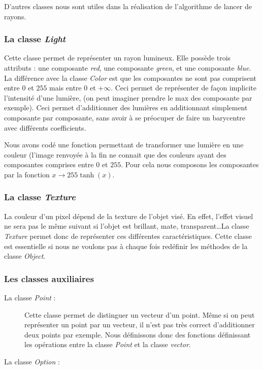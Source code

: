 \documentclass{article}
\begin{document}
D'autres classes nous sont utiles dans la réalisation de l'algorithme de lancer de rayons.

\subsubsection{La classe \emph{Light}}
Cette classe permet de représenter un rayon lumineux. Elle possède trois attributs : une composante \emph{red}, une composante \emph{green}, et une composante \emph{blue}.
La différence avec la classe \emph{Color} est que les composantes ne sont pas comprisent entre $0$ et $255$ mais entre $0$ et $+\infty$.
Ceci permet de représenter de façon implicite l'intensité d'une lumière, (on peut imaginer prendre le max des composante par exemple). Ceci permet d'additionner des lumières en additionnant simplement composante par composante, sans avoir à se préocuper de faire un barycentre avec différents coefficients. 


Nous avons codé une fonction permettant de transformer une lumière en une couleur (l'image renvoyée à la fin ne connait que des couleurs ayant des composantes comprises entre $0$ et $255$. Pour cela nous composons les composantes par la fonction $x \rightarrow 255\tanh(x)$. 

\subsubsection{La classe \emph{Texture}}
	La couleur d'un pixel dépend de la texture de l'objet visé. En effet, l'effet visuel ne sera pas le même suivant si l'objet est brillant, mate, transparent\dots La classe \emph{Texture} permet donc de représenter ces différentes caractéristiques. Cette classe est essentielle si nous ne voulons pas à chaque fois redéfinir les méthodes de la classe \emph{Object}. 

\subsubsection{Les classes auxiliaires}
	\begin{description}
		\item[La classe \emph{Point} : ]
Cette classe permet de distinguer un vecteur d'un point. Même si on peut représenter un point par un vecteur, il n'est pas très correct d'additionner deux points par exemple. Nous définissons donc des fonctions définissant les opérations entre la classe \emph{Point} et la classe \emph{vector}.

		\item[La classe \emph{Option} : ]
	\end{description}
  
\end{document}

